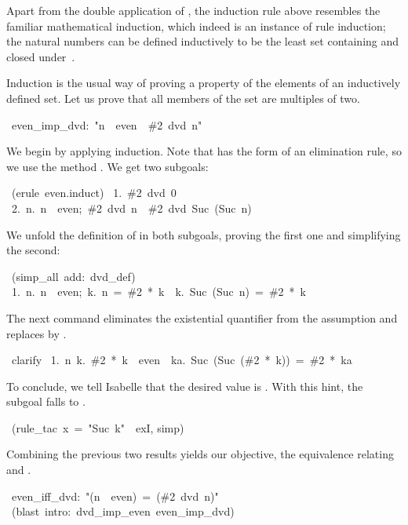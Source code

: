 Apart from the double application of , the induction rule above
resembles the familiar mathematical induction, which indeed is an instance
of rule induction; the natural numbers can be defined inductively to be
the least set containing  and closed under~.

Induction is the usual way of proving a property of the elements of an
inductively defined set.  Let us prove that all members of the set
 are multiples of two.  
\begin{isabelle}
\ even_imp_dvd:\ "n\ \isasymin \ even\ \isasymLongrightarrow \ \#2\ dvd\ n"
\end{isabelle}
%
We begin by applying induction.  Note that  has the form
of an elimination rule, so we use the method .  We get two
subgoals:
\begin{isabelle}
\ (erule\ even.induct)
\isanewline\isanewline
\ 1.\ \#2\ dvd\ 0\isanewline
\ 2.\ \isasymAnd n.\ \isasymlbrakk n\ \isasymin \ even;\ \#2\ dvd\ n\isasymrbrakk \ \isasymLongrightarrow \ \#2\ dvd\ Suc\ (Suc\ n)
\end{isabelle}
%
We unfold the definition of  in both subgoals, proving the first
one and simplifying the second:
\begin{isabelle}
\ (simp_all\ add:\ dvd_def)
\isanewline\isanewline
\ 1.\ \isasymAnd n.\ \isasymlbrakk n\ \isasymin \ even;\ \isasymexists k.\
n\ =\ \#2\ *\ k\isasymrbrakk \ \isasymLongrightarrow \ \isasymexists k.\
Suc\ (Suc\ n)\ =\ \#2\ *\ k
\end{isabelle}
%
The next command eliminates the existential quantifier from the assumption
and replaces  by .
\begin{isabelle}
\ clarify
\isanewline\isanewline
\ 1.\ \isasymAnd n\ k.\ \#2\ *\ k\ \isasymin \ even\ \isasymLongrightarrow \ \isasymexists ka.\ Suc\ (Suc\ (\#2\ *\ k))\ =\ \#2\ *\ ka%
\end{isabelle}
%
To conclude, we tell Isabelle that the desired value is
.  With this hint, the subgoal falls to .
\begin{isabelle}
\isacommand{apply}\ (rule_tac\ x\ =\ "Suc\ k"\ \isakeyword{in}\ exI, simp)
\end{isabelle}


\medskip
Combining the previous two results yields our objective, the
equivalence relating  and . 
%
\begin{isabelle}
\ even_iff_dvd:\ "(n\ \isasymin \ even)\ =\ (\#2\ dvd\ n)"\isanewline
\isacommand{by}\ (blast\ intro:\ dvd_imp_even\ even_imp_dvd)
\end{isabelle}


